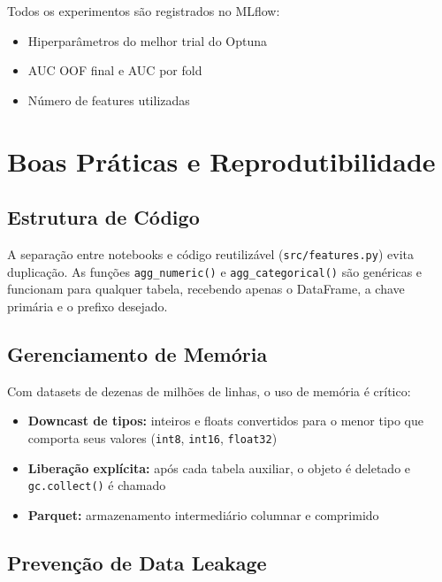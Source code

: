 \documentclass[12pt, a4paper]{article}
\begin{document}
Todos os experimentos s\~ao registrados no MLflow:
\begin{itemize}
    \item Hiperpar\^ametros do melhor trial do Optuna
    \item AUC OOF final e AUC por fold
    \item N\'umero de features utilizadas
\end{itemize}

\section{Boas Pr\'aticas e Reprodutibilidade}

\subsection{Estrutura de C\'odigo}

A separa\c{c}\~ao entre notebooks e c\'odigo reutiliz\'avel (\texttt{src/features.py})
evita duplica\c{c}\~ao. As fun\c{c}\~oes \texttt{agg\_numeric()} e
\texttt{agg\_categorical()} s\~ao gen\'ericas e funcionam para qualquer tabela,
recebendo apenas o DataFrame, a chave prim\'aria e o prefixo desejado.

\subsection{Gerenciamento de Mem\'oria}

Com datasets de dezenas de milh\~oes de linhas, o uso de mem\'oria \'e cr\'itico:

\begin{itemize}
    \item \textbf{Downcast de tipos:} inteiros e floats convertidos para o menor tipo
          que comporta seus valores (\texttt{int8}, \texttt{int16}, \texttt{float32})
    \item \textbf{Libera\c{c}\~ao expl\'icita:} ap\'os cada tabela auxiliar, o objeto
          \'e deletado e \texttt{gc.collect()} \'e chamado
    \item \textbf{Parquet:} armazenamento intermedi\'ario columnar e comprimido
\end{itemize}

\subsection{Preven\c{c}\~ao de Data Leakage}
\end{document}
